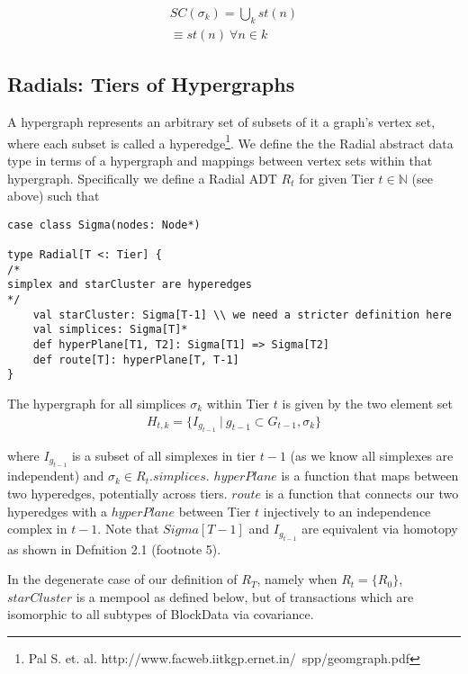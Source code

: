 \documentclass{article}
\begin{document}
\begin{equation} \label{eq1}
\begin{split}
SC(\sigma_k) = \bigcup_k st(n) \\
\equiv st(n) \ \forall n \in k
\end{split}
\end{equation}

\subsection{Radials: Tiers of Hypergraphs}
A hypergraph represents an arbitrary set of subsets of it a graph's vertex set, where each subset is called a hyperedge\footnote{Pal S. et. al. http://www.facweb.iitkgp.ernet.in/~spp/geomgraph.pdf}. We define the the Radial abstract data type in terms of a hypergraph and mappings between vertex sets within that hypergraph. Specifically we define a Radial ADT $R_t$ for given Tier $t \in \mathbb{N}$ (see above) such that

\begin{lstlisting}
case class Sigma(nodes: Node*)

type Radial[T <: Tier] {
/*
simplex and starCluster are hyperedges
*/
	val starCluster: Sigma[T-1] \\ we need a stricter definition here
	val simplices: Sigma[T]*
	def hyperPlane[T1, T2]: Sigma[T1] => Sigma[T2]
	def route[T]: hyperPlane[T, T-1]
}
\end{lstlisting}

The hypergraph for all simplices $\sigma_k$ within Tier $t$ is given by the two element set
\begin{equation} \label{eq1}
\begin{split}
H_{t,k} = \{I_{g_{t-1}} \ | \ g_{t-1} \subset G_{t-1}, \sigma_k \}
\end{split}
\end{equation}

where $I_{g_{t-1}}$ is a subset of all simplexes in tier $t-1$ (as we know all simplexes are independent) and $\sigma_k \in R_t.simplices$. $hyperPlane$ is a function that maps between two hyperedges, potentially across tiers. $route$ is a function that connects our two hyperedges with a $hyperPlane$ between Tier $t$ injectively to an independence complex in $t-1$. Note that $Sigma[T-1]$ and $I_{g_{t-1}}$ are equivalent via homotopy as shown in Defnition 2.1 (footnote 5). 

In the degenerate case of our definition of $R_T$, namely when $R_t = \{R_0\}$, $starCluster$ is a mempool as defined below, but of transactions which are isomorphic to all subtypes of BlockData via covariance.
\end{document}
